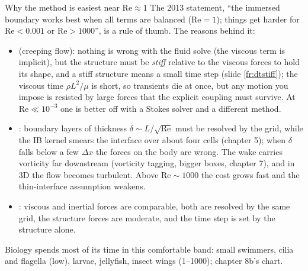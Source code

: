 \documentclass[aspectratio=169,11pt]{beamer}
\begin{document}
\begin{frame}{Why the method is easiest near $\mathrm{Re} \approx 1$}
\label{fr:re2}
\small The 2013 statement, ``the immersed boundary works best when all terms are balanced ($\mathrm{Re} = 1$); things get harder for $\mathrm{Re} < 0.001$ or $\mathrm{Re} > 1000$'', is a rule of thumb. The reasons behind it:
\begin{itemize}
  \item {} (creeping flow): nothing is wrong with the fluid solve (the viscous term is implicit), but the structure must be \emph{stiff} relative to the viscous forces to hold its shape, and a stiff structure means a small time step (slide \ref{fr:dtstiff}); the viscous time $\rho L^2/\mu$ is short, so transients die at once, but any motion you impose is resisted by large forces that the explicit coupling must survive. At $\mathrm{Re} \ll 10^{-3}$ one is better off with a Stokes solver and a different method.
  \item {}: boundary layers of thickness $\delta \sim L/\sqrt{\mathrm{Re}}$ must be resolved by the grid, while the IB kernel smears the interface over about four cells (chapter 5); when $\delta$ falls below a few $\Delta x$ the forces on the body are wrong. The wake carries vorticity far downstream (vorticity tagging, bigger boxes, chapter 7), and in 3D the flow becomes turbulent. Above $\mathrm{Re} \sim 1000$ the cost grows fast and the thin-interface assumption weakens.
  \item {}: viscous and inertial forces are comparable, both are resolved by the same grid, the structure forces are moderate, and the time step is set by the structure alone.
\end{itemize}
\vspace{1mm}
\small Biology spends most of its time in this comfortable band: small swimmers, cilia and flagella (low), larvae, jellyfish, insect wings (1--1000); chapter 8b's chart.
\end{frame}
\end{document}
